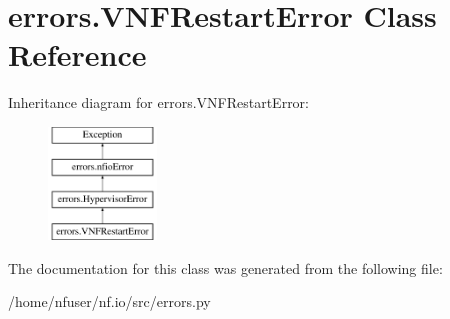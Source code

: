 \hypertarget{classerrors_1_1VNFRestartError}{\section{errors.\-V\-N\-F\-Restart\-Error Class Reference}
\label{classerrors_1_1VNFRestartError}
}
Inheritance diagram for errors.\-V\-N\-F\-Restart\-Error\-:\begin{figure}[H]
\begin{center}
\leavevmode
\includegraphics[height=3.000000cm]{classerrors_1_1VNFRestartError}
\end{center}
\end{figure}


The documentation for this class was generated from the following file\-:\begin{DoxyCompactItemize}
\item 
/home/nfuser/nf.\-io/src/errors.\-py\end{DoxyCompactItemize}
